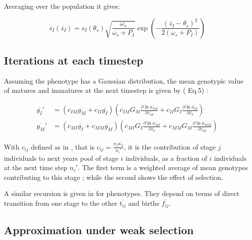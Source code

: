Averaging over the population it gives:

\begin{equation}
	\label{eq:poplht}
	\overline{s_{I}}(\overline{z_{I}}) = s_{I}(\theta_{s}) \sqrt{\frac{\omega_{s}}{\omega_{s}+P_{I}}}	\exp\left(-\frac{(\overline{z_{I}} - \theta_{s})^2}{2(\omega_{s}+P_{I})}\right)
\end{equation}

\subsection*{Iterations at each timestep}

Assuming the phenotype has a Gaussian distribution,  the mean genotypic value of matures and immatures at the next timestep is given by (\citealt{barfield_evolution_2011} Eq.5) :

\begin{subequations}
	\begin{align}
		\label{eq:genotypic}
		\overline{g_{I}}' &= (c_{I M} \overline{g_{M}} + c_{I I} \overline{g_{I}}) 
			\left(c_{I M} G_{M} \frac{\partial \ln \overline{a_{IM}}}{\partial \overline{z_{M}}} + c_{I I} G_{I} \frac{\partial \ln \overline{a_{I I}}}{\partial \overline{z_{I}}}\right) \\
		\overline{g_{M}}' &=	 (c_{M I} \overline{g_{I}} + c_{M M} \overline{g_{M}}) 
				\left(c_{M I} G_{I} \frac{\partial \ln \overline{a_{M I}}}{\partial \overline{z_{I}}} + c_{M M} G_{M} \frac{\partial \ln \overline{a_{M M}}}{\partial \overline{z_{M}}}\right)
	\end{align}
\end{subequations}

With $c_{ij}$ defined as in \citep{barfield_evolution_2011}, that is $c_{ij} = \frac{n_j \overline{a_{ij}}}{n_i'}$, it is the contribution of stage $j$ individuals to next years pool of stage $i$ individuals, as a fraction of $i$ individuals at the next time step $n_i'$.
The first term is a weighted average of mean genotypes contributing to this stage ; while the second shows the effect of selection.

A similar recursion is given in \citep{barfield_evolution_2011} for phenotypes. They depend on terms of direct transition from one stage to the other $\overline{t_{ij}}$ and births $\overline{f_{ij}}$.

\subsection*{Approximation under weak selection}

